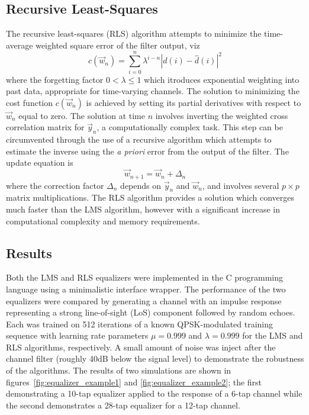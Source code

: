 \subsection{Recursive Least-Squares}
The recursive least-squares (RLS) algorithm attempts to minimize the
time-average weighted square error of the filter output, viz
\begin{equation}
c(\vec{w}_n) = \sum\limits_{i=0}^{n}{ \lambda^{i-n} \left| d(i)-\hat{d}(i)\right|^2 }
\end{equation}
where the forgetting factor $0<\lambda\leq 1$ which itroduces exponential
weighting into past data, appropriate for time-varying channels.
The solution to minimizing the cost function $c(\vec{w}_n)$ is achieved by
setting its partial derivatives with respect to $\vec{w}_n$ equal to zero.
The solution at time $n$ involves inverting the weighted cross correlation
matrix for $\vec{y}_n$, a computationally complex task.
This step can be circumvented through the use of a recursive algorithm which
attempts to estimate the inverse using the {\it a priori} error from the
output of the filter.
The update equation is
\begin{equation}
\label{eq:rls:weight_update}
\vec{w}_{n+1} = \vec{w}_n + \Delta_{n}
\end{equation}
where the correction factor $\Delta_{n}$ depends on $\vec{y}_n$ and $\vec{w}_n$,
and involves several $p \times p$ matrix multiplications.
The RLS algorithm provides a solution which converges much faster than the LMS
algorithm, however with a significant increase in computational complexity and
memory requirements.

\subsection{Results}
Both the LMS and RLS equalizers were implemented in the C programming
language using a minimalistic interface wrapper.
The performance of the two equalizers were compared by generating a channel
with an impulse response representing a strong line-of-sight (LoS) component
followed by random echoes.
Each was trained on 512 iterations of a known QPSK-modulated training sequence with learning
rate parameters $\mu=0.999$ and $\lambda=0.999$ for the LMS and RLS algorithms,
respectively.
A small amount of noise was inject after the channel filter (roughly 40dB
below the signal level) to demonstrate the robustness of the algorithms.
The results of two simulations are shown in
figures~\ref{fig:equalizer_example1} and \ref{fig:equalizer_example2};
the first demonstrating a 10-tap equalizer applied to the response of a 6-tap
channel while the second demonstrates a 28-tap equalizer for a 12-tap
channel.

